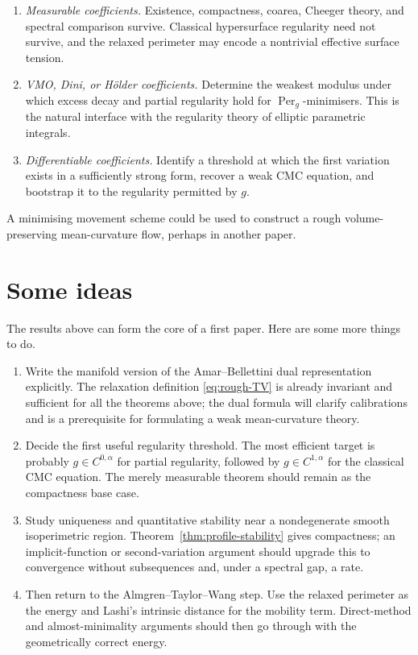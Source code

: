 \documentclass[11pt]{amsart}
\theoremstyle{definition}
\theoremstyle{remark}
\newcommand{\Per}{\operatorname{Per}}
\begin{document}
\begin{enumerate}
\item \emph{Measurable coefficients.}  Existence, compactness, coarea,
  Cheeger theory, and spectral comparison survive.  Classical hypersurface
  regularity need not survive, and the relaxed perimeter may encode a
  nontrivial effective surface tension.
\item \emph{VMO, Dini, or H\"older coefficients.}  Determine the weakest
  modulus under which excess decay and partial regularity hold for
  $\Per_g$-minimisers.  This is the natural interface with the regularity
  theory of elliptic parametric integrals.
\item \emph{Differentiable coefficients.}  Identify a threshold at which the
  first variation exists in a sufficiently strong form, recover a weak CMC
  equation, and bootstrap it to the regularity permitted by $g$.
\end{enumerate}

A minimising movement scheme could be used to construct a rough volume-preserving mean-curvature flow, perhaps in another paper.

\section{Some ideas}

The results above can form the core of a  first paper.
Here are some more things to do.

\begin{enumerate}
\item Write the manifold version of the Amar--Bellettini dual
  representation explicitly.  The relaxation definition
  \eqref{eq:rough-TV} is already invariant and sufficient for all the
  theorems above; the dual formula will clarify calibrations and is a
  prerequisite for formulating a weak mean-curvature theory.
\item Decide the first useful regularity threshold.  The most efficient target
  is probably $g\in C^{0,\alpha}$ for partial regularity, followed by
  $g\in C^{1,\alpha}$ for the classical CMC equation.  The merely measurable
  theorem should remain as the compactness base case.
\item Study uniqueness and quantitative stability near a nondegenerate smooth
  isoperimetric region.  Theorem~\ref{thm:profile-stability} gives compactness;
  an implicit-function or second-variation argument should upgrade this to
  convergence without subsequences and, under a spectral gap, a rate.
\item Then return to the Almgren--Taylor--Wang step.  Use the relaxed
  perimeter as the energy and Lashi's intrinsic distance for the mobility
  term.  Direct-method and almost-minimality arguments should then go through with the geometrically correct energy.
\end{enumerate}
\end{document}
